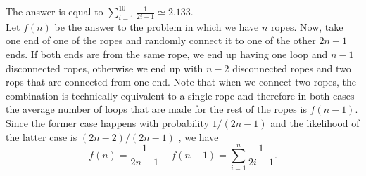 \begin{solution}
The answer is equal to $\sum_{i=1}^{10} \frac{1}{2i-1} \simeq 2.133$.\\[0.2cm]

Let $f(n)$ be the answer to the problem in which we have $n$ ropes. Now, take one end of one of the ropes and randomly connect it to one of the other $2n-1$ ends. If both ends are from the same rope, we end up having one loop and $n-1$ disconnected ropes, otherwise we end up with $n-2$ disconnected ropes and two rops that are connected from one end. Note that when we connect two ropes, the combination is technically equivalent to a single rope and therefore in both cases the average number of loops that are made for the rest of the ropes is $f(n-1)$. Since the former case happens with probability $1/(2n-1)$ and the likelihood of the latter case is $(2n-2)/(2n-1)$ , we have $$f(n) = \frac{1}{2n-1} + f(n-1) = \sum_{i=1}^{n} \frac{1}{2i-1}.$$

\end{solution}
